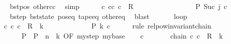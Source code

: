 \begin{isabellebody}
\ \ \ \ \ \ \isamarkupfalse%
\ bst{\isacharunderscore}{\kern0pt}pos\ other{\isacharunderscore}{\kern0pt}cc\ \isamarkupfalse%
\ simp\isanewline
\ \ \ \ \isamarkupfalse%
\ {\isachardoublequoteopen}{\isasymexists}c{\isacharprime}{\kern0pt}{\isacharprime}{\kern0pt}{\isachardot}{\kern0pt}\ {\isacharparenleft}{\kern0pt}cc{\isacharcomma}{\kern0pt}\ c{\isacharprime}{\kern0pt}{\isacharprime}{\kern0pt}{\isacharparenright}{\kern0pt}\ {\isasymin}\ R{\isacharprime}{\kern0pt}\isanewline
\ \ \ \ \ \ \ \ \ \ \ \ \ \ \ \ {\isasymand}\ {\isacharquery}{\kern0pt}P\ {\isacharparenleft}{\kern0pt}Suc\ j{\isacharparenright}{\kern0pt}\ c{\isacharprime}{\kern0pt}{\isacharprime}{\kern0pt}{\isachardoublequoteclose}\isanewline
\ \ \ \ \ \ \isamarkupfalse%
\ bstep\ bst{\isacharunderscore}{\kern0pt}state\ pos{\isacharunderscore}{\kern0pt}eq\ tape{\isacharunderscore}{\kern0pt}eq\ other{\isacharunderscore}{\kern0pt}eq\ \isamarkupfalse%
\ blast\isanewline
\ \ \isamarkupfalse%
\isanewline
\ \ \isamarkupfalse%
\ loop{\isacharcolon}{\kern0pt}\isanewline
\ \ \ \ \ \ {\isachardoublequoteopen}{\isasymexists}c{\isacharprime}{\kern0pt}{\isachardot}{\kern0pt}\ {\isacharparenleft}{\kern0pt}c{}{\isacharcomma}{\kern0pt}\ c{\isacharprime}{\kern0pt}{\isacharparenright}{\kern0pt}\ {\isasymin}\ R{\isacharprime}{\kern0pt}\ {\isacharcircum}{\kern0pt}{\isacharcircum}{\kern0pt}\ {\isacharquery}{\kern0pt}k\isanewline
\ \ \ \ \ \ \ \ \ \ \ \ {\isasymand}\ {\isacharquery}{\kern0pt}P\ {\isacharquery}{\kern0pt}k\ c{\isacharprime}{\kern0pt}{\isachardoublequoteclose}\isanewline
\ \ \ \ \isamarkupfalse%
\ {\isacharparenleft}{\kern0pt}rule\ relpow{\isacharunderscore}{\kern0pt}invariant{\isacharunderscore}{\kern0pt}chain\isanewline
\ \ \ \ \ \ \ \ \ \ {\isacharbrackleft}{\kern0pt}\ P\ {\isacharequal}{\kern0pt}\ {\isacharquery}{\kern0pt}P\ \ n\ {\isacharequal}{\kern0pt}\ {\isacharquery}{\kern0pt}k{\isacharcomma}{\kern0pt}\ OF\ mystep\ mybase{\isacharbrackright}{\kern0pt}{\isacharparenright}{\kern0pt}\isanewline
\ \ \isamarkupfalse%
\ c{\isacharprime}{\kern0pt}\ \isanewline
\ \ \ \ \ \ chain{\isacharcolon}{\kern0pt}\ {\isachardoublequoteopen}{\isacharparenleft}{\kern0pt}c{}{\isacharcomma}{\kern0pt}\ c{\isacharprime}{\kern0pt}{\isacharparenright}{\kern0pt}\ {\isasymin}\ R{\isacharprime}{\kern0pt}\ {\isacharcircum}{\kern0pt}{\isacharcircum}{\kern0pt}\ {\isacharquery}{\kern0pt}k{\isachardoublequoteclose}\isanewline

\end{isabellebody}
